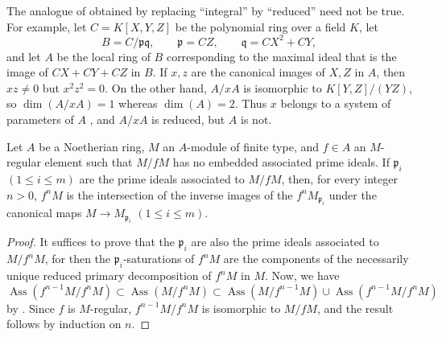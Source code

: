 \begin{remark}[3.4.8]
\label{IV.3.4.8}
The analogue of  obtained by replacing ``integral'' by ``reduced'' need not be true.
For example, let $C=K[X,Y,Z]$ be the polynomial ring over a field $K$, let
\[
B=C/\mathfrak p\mathfrak q,
\qquad
\mathfrak p=CZ,
\qquad
\mathfrak q=CX^2+CY,
\]
and let $A$ be the local ring of $B$ corresponding to the maximal ideal that is the image of $CX+CY+CZ$ in $B$.
If $x,z$ are the canonical images of $X,Z$ in $A$, then $xz\neq 0$ but $x^2z^2=0$.
On the other hand, $A/xA$ is isomorphic to $K[Y,Z]/(YZ)$, so $\dim(A/xA)=1$ whereas $\dim(A)=2$.
Thus $x$ belongs to a system of parameters of $A$ , and $A/xA$ is reduced, but $A$ is not.
\end{remark}

\begin{proposition}[3.4.9]
\label{IV.3.4.9}
Let $A$ be a Noetherian ring, $M$ an $A$-module of finite type, and $f\in A$ an $M$-regular element such that $M/fM$ has no embedded associated prime ideals.
If $\mathfrak p_i$ $(1\leqslant i\leqslant m)$ are the prime ideals associated to $M/fM$, then, for every integer $n>0$, $f^nM$ is the intersection of the inverse images of the $f^nM_{\mathfrak p_i}$ under the canonical maps $M\to M_{\mathfrak p_i}$ $(1\leqslant i\leqslant m)$.
\end{proposition}

\begin{proof}
It suffices to prove that the $\mathfrak p_i$ are also the prime ideals associated to $M/f^nM$, for then the $\mathfrak p_i$-saturations of $f^nM$ are the components of the necessarily unique reduced primary decomposition of $f^nM$ in $M$.
Now, we have
\[
\operatorname{Ass}(f^{n-1}M/f^nM)
\subset
\operatorname{Ass}(M/f^nM)
\subset
\operatorname{Ass}(M/f^{n-1}M)
\cup
\operatorname{Ass}(f^{n-1}M/f^nM)
\]
by .
Since $f$ is $M$-regular, $f^{n-1}M/f^nM$ is isomorphic to $M/fM$, and the result follows by induction on $n$.
\end{proof}
